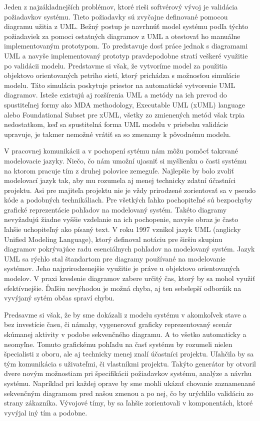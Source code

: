 Jeden z najzákladnejších problémov, ktoré rieši softvérový vývoj je validácia požiadavkov systému. Tieto požiadavky sú zvyčajne definované pomocou diagramu užitia z UML. 
Bežný postup je navrhnúť model systému podľa týchto požiadaviek za pomoci ostatných diagramov z UML a otestovať ho manuálne implementovaným prototypom. To predstavuje dosť práce jednak s diagramami UML a navyše implementovaný prototyp pravdepodobne stratí veškeré využitie po validácii modelu. Predstavme si však, že vytvoríme model za použitia objektovo orientovaných petriho sietí, ktorý prichádza s možnosťou simulácie modelu. Táto simulácia poskytuje priestor na automatické vytvorenie UML diagramov. Isteže existujú aj rozšírenia UML a metódy na ich prevod do spustiteľnej formy ako MDA methodology, Executable UML (xUML) language alebo Foundational Subset pre xUML, všetky zo zmienených metód však trpia nedostatkom, keď sa spustitelná forma UML modelu v priebehu validácie upravuje, je takmer nemožné vrátiť sa so zmenamy k pôvodnému modelu. 

V pracovnej komunikácii a v pochopení sytému nám môžu pomôcť takzvané modelovacie jazyky. Niečo, čo nám umožní ujasniť si myšlienku o časti systému na ktorom pracuje tím z druhej polovice zemeguľe. Najlepšie by bolo zvoliť modelovací jazyk tak, aby mu rozumela aj menej technicky zdatní účastníci projektu. Asi pre majiteľa projektu nie je vždy prirodzené zorientovať sa v pseudo kóde a podobných technikáliach. Pre všetkých ľahko pochopiteľné sú bezpochyby grafické reprezentácie pohľadov na modelovaný systém. Takéto diagramy nevyžadujú žiadne vyššie vzdelanie na ich pochopenie, navyše obraz je často ľahšie uchopiteľný ako písaný text. V roku 1997 vznikol jazyk UML (anglicky Unified Modeling Language), ktorý definoval notáciu pre širšiu skupinu diagramov pokrývajúce radu esenciálnych pohľadov na modelovaný systém. Jazyk UML sa rýchlo stal štandartom pre diagramy používané na modelovanie systémov. Jeho najprirodzenejšie využitie je práve u objektovo orientovaných modelov. V praxi kreslenie diagramov zabere určitý čas, ktorý by sa mohol využiť efektívnejšie. Ďaľšiu nevýhodou je možná chyba, aj ten sebelepší odborńik na vyvýjaný sytém občas spraví chybu.

Predsavme si však, že by sme dokázali z modelu systému v akomkoľvek stave a bez investície času, či námahy, vygenerovať graficky reprezentovaný scenár skúmanej aktivity v podobe sekvenčného diagramu. A to všetko automaticky a neomyľne. Tomuto grafickému pohľadu na časť systému by rozumeli nielen špecialisti z oboru, ale aj technicky menej znalí účastníci projektu. Uľahčila by sa tým komunikácia s uživateľmi, či vlastníkmi projektu. Takýto generátor by otvoril dvere novým možnostiam pri špecifikácii požiadavkov systému, analýze a návrhu systému. Napríklad pri každej oprave by sme mohli ukázať chovanie zaznamenané sekvenčným diagramom pred našou zmenou a po nej, čo by urýchlilo validáciu zo strany zákazníka. Vývojové tímy, by sa ľahšie zorientovali v komponentách, ktoré vyvýjal iný tím a podobne.


